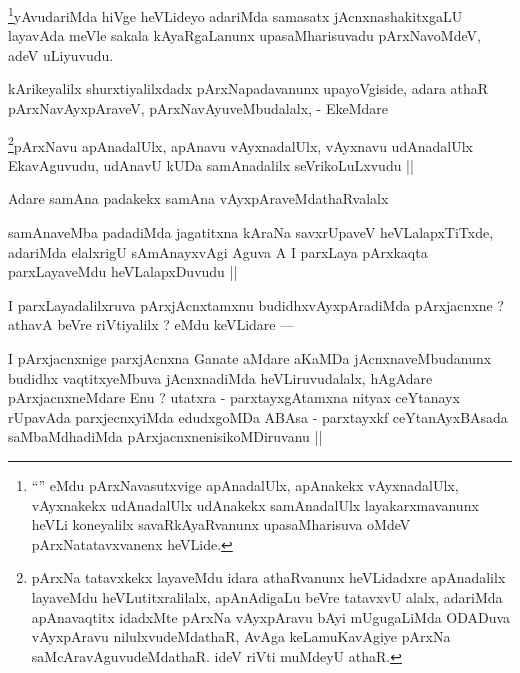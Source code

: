 \begin{artha}
\footnote[2]{``\stext'' eMdu pArxNavasutxvige apAnadalUlx, apAnakekx vAyxnadalUlx, vAyxnakekx udAnadalUlx udAnakekx samAnadalUlx layakarxmavanunx heVLi koneyalilx savaRkAyaRvanunx upasaMharisuva oMdeV pArxNatatavxvanenx heVLide.}yAvudariMda hiVge heVLideyo adariMda samasatx jAcnxnashakitxgaLU layavAda meVle sakala kAyaRgaLanunx upasaMharisuvadu pArxNavoMdeV, adeV uLiyuvudu.
\end{artha}

\begin{artha}
kArikeyalilx shurxtiyalilxdadx pArxNapadavanunx upayoVgiside, adara athaR pArxNavAyxpAraveV, pArxNavAyuveMbudalalx, - EkeMdare 
\end{artha}

\begin{artha}
\footnote[1]{pArxNa tatavxkekx layaveMdu idara athaRvanunx heVLidadxre apAnadalilx layaveMdu heVLutitxralilalx, apAnAdigaLu beVre tatavxvU alalx, adariMda apAnavaqtitx idadxMte pArxNa vAyxpAravu bAyi mUgugaLiMda ODADuva vAyxpAravu nilulxvudeMdathaR, AvAga keLamuKavAgiye pArxNa saMcAravAguvudeMdathaR. ideV riVti muMdeyU athaR.}pArxNavu apAnadalUlx, apAnavu vAyxnadalUlx, vAyxnavu udAnadalUlx EkavAguvudu, udAnavU kUDa samAnadalilx seVrikoLuLxvudu ||
\end{artha}

\begin{artha}
Adare samAna padakekx samAna vAyxpAraveMdathaRvalalx
\end{artha}

\begin{artha}
samAnaveMba padadiMda jagatitxna kAraNa savxrUpaveV heVLalapxTiTxde, adariMda elalxrigU sAmAnayxvAgi Aguva A I parxLaya pArxkaqta parxLayaveMdu heVLalapxDuvudu ||
\end{artha}

\begin{artha}
I parxLayadalilxruva pArxjAcnxtamxnu budidhxvAyxpAradiMda pArxjacnxne ? athavA beVre riVtiyalilx ? eMdu keVLidare ---
\end{artha}

\begin{artha}
I pArxjacnxnige parxjAcnxna Ganate aMdare aKaMDa jAcnxnaveMbudanunx budidhx vaqtitxyeMbuva jAcnxnadiMda heVLiruvudalalx, hAgAdare pArxjacnxneMdare Enu ? utatxra - parxtayxgAtamxna nityax ceYtanayx rUpavAda parxjecnxyiMda edudxgoMDa ABAsa - parxtayxkf ceYtanAyxBAsada saMbaMdhadiMda pArxjacnxnenisikoMDiruvanu ||
\end{artha}

